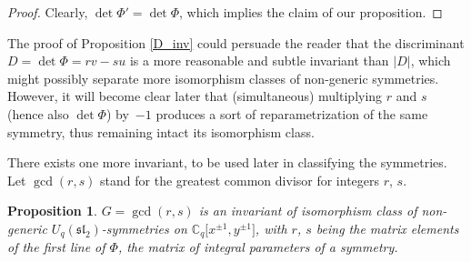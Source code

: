 \documentclass[pdftex]{sigma}
\numberwithin{equation}{section}
\newtheorem{Proposition}[Theorem]{Proposition}
 { \theoremstyle{definition}
\newtheorem{Definition}[Theorem]{Definition}
\newtheorem{Remark}[Theorem]{Remark} }
\begin{document}
\begin{proof}
Clearly, $\det\Phi'=\det\Phi$, which implies the claim of our proposition. \end{proof}

\begin{Remark}The proof of Proposition \ref{D_inv} could persuade the reader that the discriminant $D=\det\Phi=rv-su$ is a more reasonable and subtle invariant than $|D|$, which might possibly separate more isomorphism classes of non-generic symmetries. However, it will become clear later that (simultaneous) multiplying $r$ and $s$ (hence also $\det\Phi$) by~$-1$ produces a sort of reparametrization of the same symmetry, thus remaining intact its isomorphism class.
\end{Remark}

There exists one more invariant, to be used later in classifying the symmetries. Let $\operatorname{gcd}(r,s)$ stand for the greatest common divisor for integers $r$, $s$.

\begin{Proposition}$G=\operatorname{gcd}(r,s)$ is an invariant of isomorphism class of non-generic $U_q(\mathfrak{sl}_2)$-symmetries on $\mathbb{C}_q\big[x^{\pm 1},y^{\pm 1}\big]$, with $r$, $s$ being the matrix elements of the first line of $\Phi$, the matrix of integral parameters of a symmetry.
\end{Proposition}
\end{document}
